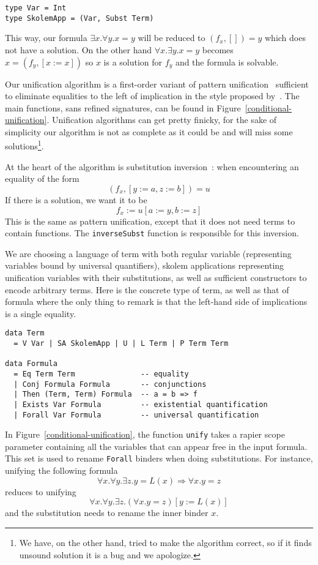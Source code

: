 \documentclass[sigconf, review]{acmart}
\newcommand{\tc}[1]{{\small\texttt{#1}}}
\begin{document}
\begin{verbatim}
type Var = Int
type SkolemApp = (Var, Subst Term)
\end{verbatim}

This way, our formula $\exists x. \forall y. x=y$ will be reduced to
$(f_{x},[]) = y$ which does not have a solution. On the other hand
$\forall x. \exists y. x = y$ becomes $x = (f_{y}, [x:=x])$ so $x$ is a solution
for $f_{y}$ and the formula is solvable.

Our unification algorithm is a first-order variant of pattern
unification~\cite{miller91-pattern} sufficient to eliminate equalities to the
left of implication in the style proposed by~\citet{miller22}. The main
functions, sans refined signatures, can be found in
Figure~\ref{conditional-unification}. Unification algorithms can get pretty
finicky, for the sake of simplicity our algorithm is not as complete as it could
be and will miss some solutions\footnote{We have, on the other hand, tried to
  make the algorithm correct, so if it finds unsound solution it is a bug and we
  apologize.}.

At the heart of the algorithm is substitution inversion~\cite{ziliani15}: when
encountering an equality of the form
$$(f_{x},[y:=a, z:=b]) = u$$
If there is a solution, we want it to be
$$f_{x} := u[a:=y, b:=z]$$
This is the same as pattern unification, except that it does not need terms to
contain functions. The \tc{inverseSubst} function is responsible for this
inversion.

We are choosing a language of term with both regular variable (representing
variables bound by universal quantifiers), skolem applications representing
unification variables with their substitutions, as well as sufficient
constructors to encode arbitrary terms. Here is the concrete type of term, as
well as that of formula where the only thing to remark is that the left-hand
side of implications is a single equality.

\begin{verbatim}
data Term
  = V Var | SA SkolemApp | U | L Term | P Term Term

data Formula
  = Eq Term Term               -- equality
  | Conj Formula Formula       -- conjunctions
  | Then (Term, Term) Formula  -- a = b => f
  | Exists Var Formula         -- existential quantification
  | Forall Var Formula         -- universal quantification
\end{verbatim}

In Figure~\ref{conditional-unification}, the function \tc{unify} takes a rapier scope parameter containing all the variables that
can appear free in the input formula. This set is used to rename \tc{Forall}
binders when doing substitutions. For instance, unifying the following formula
$$\forall x. \forall y. \exists z. y = L(x) \Rightarrow \forall x. y = z$$
reduces to unifying
$$\forall x. \forall y. \exists z. (\forall x. y = z)[y:=L(x)]$$
and the substitution needs to rename the inner binder $x$.
\end{document}
